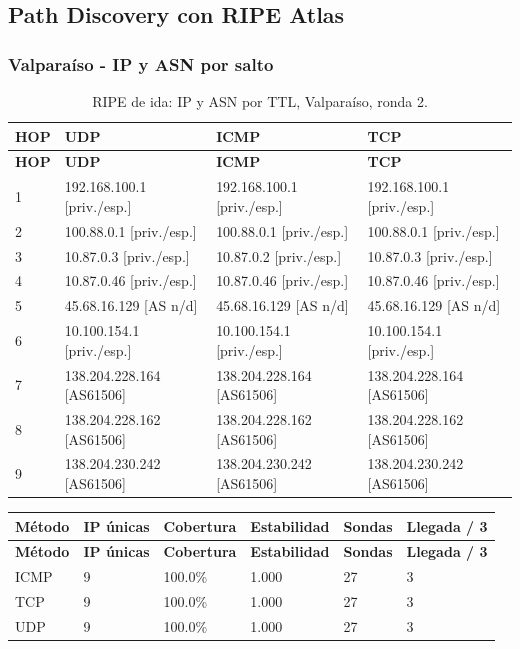 \subsection{Path Discovery con RIPE Atlas}\label{sec:ripe}


\subsubsection{Valparaíso - IP y ASN por salto}


\begingroup
\fontsize{9}{11}\selectfont
\begin{longtable}{p{0.95cm}p{4.716666666666667cm}p{4.716666666666667cm}p{4.716666666666667cm}}
\caption{RIPE de ida: IP y ASN por TTL, Valparaíso, ronda 2.}\label{ripe:138.204.230.242} \\
\toprule
\textbf{HOP} & \textbf{UDP} & \textbf{ICMP} & \textbf{TCP} \\ \midrule
\endfirsthead
\toprule
\textbf{HOP} & \textbf{UDP} & \textbf{ICMP} & \textbf{TCP} \\ \midrule
\endhead
1 & 192.168.100.1 [priv./esp.] & 192.168.100.1 [priv./esp.] & 192.168.100.1 [priv./esp.] \\
2 & 100.88.0.1 [priv./esp.] & 100.88.0.1 [priv./esp.] & 100.88.0.1 [priv./esp.] \\
3 & 10.87.0.3 [priv./esp.] & 10.87.0.2 [priv./esp.] & 10.87.0.3 [priv./esp.] \\
4 & 10.87.0.46 [priv./esp.] & 10.87.0.46 [priv./esp.] & 10.87.0.46 [priv./esp.] \\
5 & 45.68.16.129 [AS n/d] & 45.68.16.129 [AS n/d] & 45.68.16.129 [AS n/d] \\
6 & 10.100.154.1 [priv./esp.] & 10.100.154.1 [priv./esp.] & 10.100.154.1 [priv./esp.] \\
7 & 138.204.228.164 [AS61506] & 138.204.228.164 [AS61506] & 138.204.228.164 [AS61506] \\
8 & 138.204.228.162 [AS61506] & 138.204.228.162 [AS61506] & 138.204.228.162 [AS61506] \\
9 & 138.204.230.242 [AS61506] & 138.204.230.242 [AS61506] & 138.204.230.242 [AS61506] \\
\bottomrule
\end{longtable}
\endgroup
\begingroup
\fontsize{9}{11}\selectfont
\addtocounter{table}{-1}
\begin{longtable}{p{3.1cm}p{1.9cm}p{2.1cm}p{2.1cm}p{1.8cm}p{2.1cm}}
\toprule
\textbf{Método} & \textbf{IP únicas} & \textbf{Cobertura} & \textbf{Estabilidad} & \textbf{Sondas} & \textbf{Llegada / 3} \\ \midrule
\endfirsthead
\toprule
\textbf{Método} & \textbf{IP únicas} & \textbf{Cobertura} & \textbf{Estabilidad} & \textbf{Sondas} & \textbf{Llegada / 3} \\ \midrule
\endhead
ICMP & 9 & 100.0\% & 1.000 & 27 & 3 \\
TCP & 9 & 100.0\% & 1.000 & 27 & 3 \\
UDP & 9 & 100.0\% & 1.000 & 27 & 3 \\
\bottomrule
\end{longtable}
\endgroup

